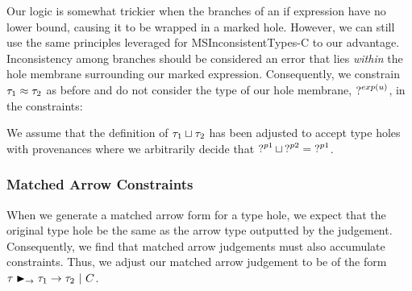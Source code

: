 \begin{mathpar}
\end{mathpar} 

Our logic is somewhat trickier when the branches of an if expression have no lower bound, causing it to be wrapped in a marked hole. However, we can still use the same principles leveraged for MSInconsistentTypes-C to our advantage. Inconsistency among branches should be considered an error that lies \emph{within} the hole membrane surrounding our marked expression. Consequently, we constrain $\TMV_1 \approx \TMV_2$ as before and do not consider the type of our hole membrane, $\TUnknown^{exp(u)}$, in the constraints:
\begin{mathpar}
\end{mathpar}
We assume that the definition of $\TJoin{\TMV_1}{\TMV_2}$ has been adjusted to accept type holes with provenances where we arbitrarily decide that $\TJoin{\TUnknown^{p1}}{\TUnknown^{p2}} = \TUnknown^{p1}$.

\subsubsection{Matched Arrow Constraints}
When we generate a matched arrow form for a type hole, we expect that the original type hole be the same as the arrow type outputted by the judgement. Consequently, we find that matched arrow judgements must also accumulate constraints. Thus, we adjust our matched arrow judgement to be of the form $\matchedArrow{\TMV}{\TMV_1}{\TMV_2} ~|~ C$.


